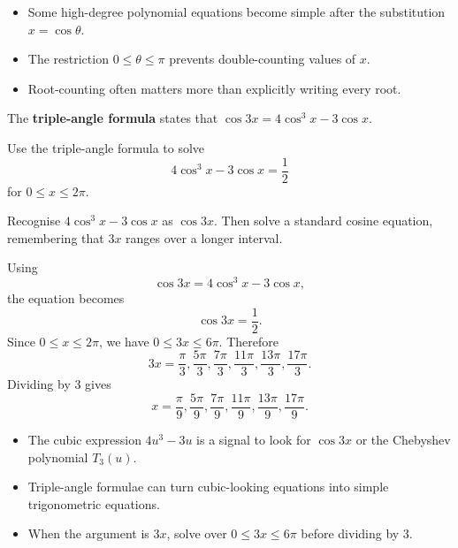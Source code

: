 \begin{takeaways}
\begin{itemize}[leftmargin=*]
  \item Some high-degree polynomial equations become simple after the
        substitution $x=\cos\theta$.
  \item The restriction $0\le\theta\le\pi$ prevents double-counting values of
        $x$.
  \item Root-counting often matters more than explicitly writing every root.
\end{itemize}
\end{takeaways}

\begin{problem}
The \textbf{triple-angle formula} states that $\cos 3x = 4\cos^3 x - 3\cos x$.

Use the triple-angle formula to solve
\[
4\cos^3x-3\cos x=\frac12
\]
for $0\le x\le2\pi$.
\end{problem}

\begin{hintbox}
Recognise $4\cos^3x-3\cos x$ as $\cos3x$. Then solve a standard cosine
equation, remembering that $3x$ ranges over a longer interval.
\end{hintbox}

\begin{solution}
Using
\[
\cos3x=4\cos^3x-3\cos x,
\]
the equation becomes
\[
\cos3x=\frac12.
\]
Since $0\le x\le2\pi$, we have $0\le3x\le6\pi$. Therefore
\[
3x=\frac{\pi}{3},\frac{5\pi}{3},\frac{7\pi}{3},\frac{11\pi}{3},
\frac{13\pi}{3},\frac{17\pi}{3}.
\]
Dividing by $3$ gives
\[
\boxed{
x=\frac{\pi}{9},\frac{5\pi}{9},\frac{7\pi}{9},\frac{11\pi}{9},
\frac{13\pi}{9},\frac{17\pi}{9}
}.
\]
\end{solution}

\begin{takeaways}
\begin{itemize}[leftmargin=*]
  \item The cubic expression $4u^3-3u$ is a signal to look for
        $\cos3x$ or the Chebyshev polynomial $T_3(u)$.
  \item Triple-angle formulae can turn cubic-looking equations into simple
        trigonometric equations.
  \item When the argument is $3x$, solve over $0\le3x\le6\pi$ before dividing
        by $3$.
\end{itemize}
\end{takeaways}

